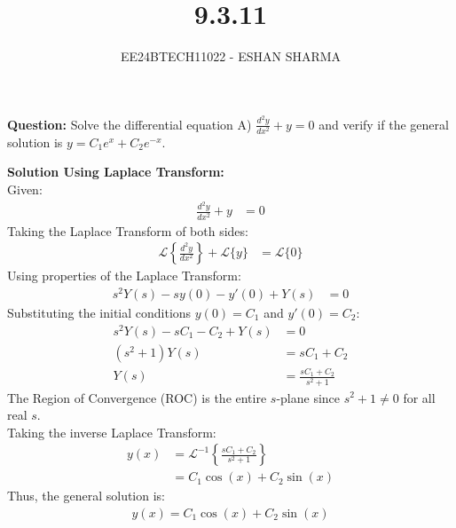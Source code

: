 \documentclass[journal]{IEEEtran}
\begin{document}
	
	
	\vspace{3cm}
	\title{9.3.11}
	\author{EE24BTECH11022 - ESHAN SHARMA}
	{\let\newpage\relax\maketitle}
	
	\renewcommand{\thefigure}{\theenumi}
	\renewcommand{\thetable}{\theenumi}
	\setlength{\intextsep}{10pt} %
	
	
	\renewcommand{\thetable}{\theenumi}
	
	\textbf{Question:} Solve the differential equation A) \( \frac{d^2y}{dx^2} + y = 0 \) and verify if the general solution is $y= C_1e^{x} + C_2e^{-x}$.\\
	
	\solution
	
	\textbf{Solution Using Laplace Transform:}\\
	Given:
	\begin{align}
		\frac{d^2y}{dx^2} + y &= 0
	\end{align}
	Taking the Laplace Transform of both sides:
	\begin{align}
		\mathcal{L}\left\{\frac{d^2y}{dx^2}\right\} + \mathcal{L}\{y\} &= \mathcal{L}\{0\}
	\end{align}
	Using properties of the Laplace Transform:
	\begin{align}
		s^2Y(s) - sy(0) - y'(0) + Y(s) &= 0
	\end{align}
	Substituting the initial conditions \( y(0) = C_1 \) and \( y'(0) = C_2 \):
	\begin{align}
		s^2Y(s) - sC_1 - C_2 + Y(s) &= 0\\
		\left(s^2 + 1\right)Y(s) &= sC_1 + C_2\\
		Y(s) &= \frac{sC_1 + C_2}{s^2 + 1}
	\end{align}
	The Region of Convergence (ROC) is the entire \( s \)-plane since \( s^2 + 1 \neq 0 \) for all real \( s \).\\
	
	Taking the inverse Laplace Transform:
	\begin{align}
		y(x) &= \mathcal{L}^{-1}\left\{\frac{sC_1 + C_2}{s^2 + 1}\right\}\\
		&= C_1\cos(x) + C_2\sin(x)
	\end{align}
	Thus, the general solution is:
	\begin{align}
		y(x) = C_1\cos(x) + C_2\sin(x)
	\end{align}
	
\end{document}
